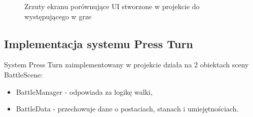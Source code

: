\documentclass{SGGW-thesis}
\begin{document}
\begin{figure}[H]
  \hfill
  \hfill
  \hfill
  \caption{Zrzuty ekranu porównujące UI stworzone w projekcie do występującego w grze \cite{SMT3}}
\end{figure}
\pagebreak
\subsection{Implementacja systemu Press Turn}
System Press Turn zaimplementowany w projekcie działa na 2 obiektach sceny BattleScene:
\begin{itemize}
  \item{BattleManager - odpowiada za logikę walki},
  \item{BattleData - przechowuje dane o postaciach, stanach i umiejętnościach}.
\end{itemize}
\end{document}
